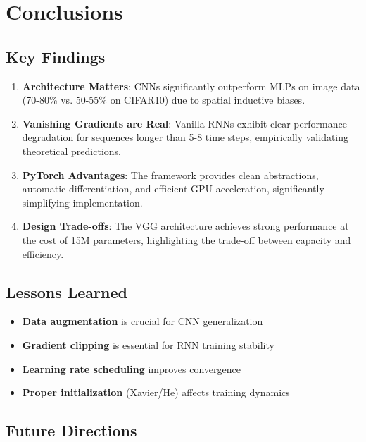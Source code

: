\documentclass[11pt,a4paper]{article}
\begin{document}
\section{Conclusions}

\subsection{Key Findings}

\begin{enumerate}
    \item \textbf{Architecture Matters}: CNNs significantly outperform MLPs on image data (70-80\% vs. 50-55\% on CIFAR10) due to spatial inductive biases.
    
    \item \textbf{Vanishing Gradients are Real}: Vanilla RNNs exhibit clear performance degradation for sequences longer than 5-8 time steps, empirically validating theoretical predictions.
    
    \item \textbf{PyTorch Advantages}: The framework provides clean abstractions, automatic differentiation, and efficient GPU acceleration, significantly simplifying implementation.
    
    \item \textbf{Design Trade-offs}: The VGG architecture achieves strong performance at the cost of 15M parameters, highlighting the trade-off between capacity and efficiency.
\end{enumerate}

\subsection{Lessons Learned}

\begin{itemize}
    \item \textbf{Data augmentation} is crucial for CNN generalization
    \item \textbf{Gradient clipping} is essential for RNN training stability
    \item \textbf{Learning rate scheduling} improves convergence
    \item \textbf{Proper initialization} (Xavier/He) affects training dynamics
\end{itemize}

\subsection{Future Directions}
\end{document}
